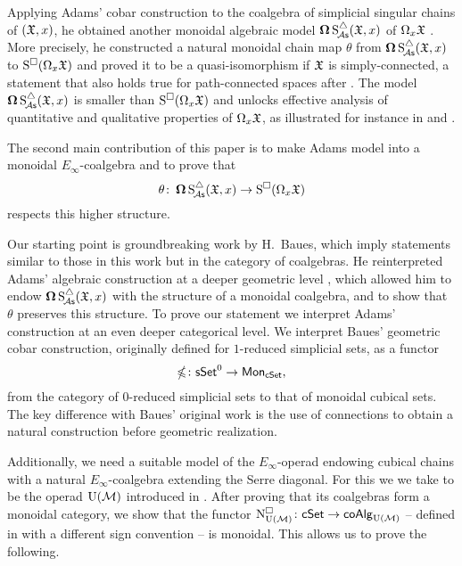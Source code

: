 Applying Adams' cobar construction to the coalgebra of simplicial singular chains of $(\mathfrak{X}, x)$, he obtained another monoidal algebraic model $\operatorname{\mathbf{\Omega}} \operatorname{S^{\triangle}_{\!{\mathcal{A}\mathsf{s}}}}(\mathfrak{X}, x)$ of $\Omega_x \mathfrak{X}$ \cite{adams1956cobar}.
More precisely, he constructed a natural monoidal chain map $\theta$ from $\operatorname{\mathbf{\Omega}} \operatorname{S^{\triangle}_{\!{\mathcal{A}\mathsf{s}}}}(\mathfrak{X}, x)$ to $\operatorname{S^{\square}}(\Omega_x \mathfrak{X})$ and proved it to be a quasi-isomorphism if $\mathfrak{X}$ is simply-connected, a statement that also holds true for path-connected spaces after \cite{rivera2018cubical}.
The model $\operatorname{\mathbf{\Omega}} \operatorname{S^{\triangle}_{\!{\mathcal{A}\mathsf{s}}}}(\mathfrak{X}, x)$ is smaller than $\operatorname{S^{\square}}(\Omega_x \mathfrak{X})$ and unlocks effective analysis of quantitative and qualitative properties of $\Omega_x \mathfrak{X}$, as illustrated for instance in \cite{chainalgebraloops} and \cite{adamscobarequivalence}.

The second main contribution of this paper is to make Adams model into a monoidal $E_\infty$-coalgebra and to prove that
\[
\theta \colon \operatorname{\mathbf{\Omega}} \operatorname{S^{\triangle}_{\!{\mathcal{A}\mathsf{s}}}}(\mathfrak{X}, x) \to \operatorname{S^{\square}}(\Omega_x \mathfrak{X})
\]
respects this higher structure.

Our starting point is groundbreaking work by H.~Baues, which imply statements similar to those in this work but in the category of coalgebras.
He reinterpreted Adams' algebraic construction at a deeper geometric level \cite{baues1998hopf}, which allowed him to endow $\operatorname{\mathbf{\Omega}} \operatorname{S^{\triangle}_{\!{\mathcal{A}\mathsf{s}}}}(\mathfrak{X}, x)$ with the structure of a monoidal coalgebra, and to show that $\theta$ preserves this structure.
To prove our statement we interpret Adams' construction at an even deeper categorical level.
We interpret Baues' geometric cobar construction, originally defined for $1$-reduced simplicial sets, as a functor
\begin{equation*}
	\operatorname{\mathbb{\Omega}} \colon \mathsf{sSet}^0 \to \mathsf{Mon}_{\mathsf{cSet}},
\end{equation*}
from the category of $0$-reduced simplicial sets to that of monoidal cubical sets.
The key difference with Baues' original work is the use of connections to obtain a natural construction before geometric realization.

Additionally, we need a suitable model of the $E_\infty$-operad endowing cubical chains with a natural $E_\infty$-coalgebra extending the Serre diagonal.
For this we we take to be the operad ${\operatorname{U}(\mathcal{M})}$ introduced in \cite{medina2020prop1}.
After proving that its coalgebras form a monoidal category, we show that the functor $\operatorname{N^{\square}_{{\operatorname{U}(\mathcal{M})}}} \colon \mathsf{cSet} \to \mathsf{coAlg}_{\operatorname{U}(\mathcal{M})}$ -- defined in \cite{medina2022cube_einfty} with a different sign convention -- is monoidal.
This allows us to prove the following.

